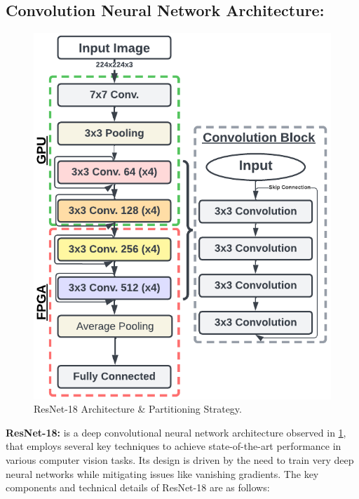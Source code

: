 
\subsection{Convolution Neural Network Architecture:} 
\begin{figure}[h]
\centering
  \includegraphics[width=0.6\columnwidth]{Images/Rensnet18.png}
    \caption{ResNet-18 Architecture \& Partitioning Strategy.}
    \label{fig:Rensnet18}
\end{figure}


\textbf{ResNet-18:} is a deep convolutional neural network architecture observed in \ref{fig:Rensnet18}, that employs several key techniques to achieve state-of-the-art performance in various computer vision tasks. Its design is driven by the need to train very deep neural networks while mitigating issues like vanishing gradients. The key components and technical details of ResNet-18 are as follows:



